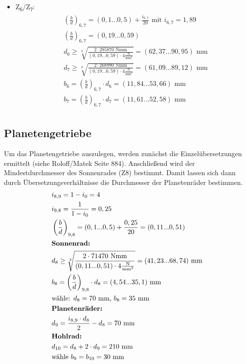 \begin{itemize}
\begin{align*}
\end{align*}
\item {Z\textsubscript{6}/Z\textsubscript{7}:}
\begin{align*}
	& \left(\frac{b}{d} \right) _{6,7} = (0,1...0,5) + \frac{i_{6,7}}{20} \text{ mit } i_{6,7} =  1,89 \\
	&\left(\frac{b}{d} \right) _{6,7}=  (0,19...0,59) \\
	&d_6 \ge \sqrt[3]{\frac{2 \cdot 285870 \text{ Nmm}}{(0,19...0,59) \cdot  4 \frac{\text{N}}{\text{mm}^2}}}= (62,37...90,95) \text{ mm}\\
	&d_7 \ge \sqrt[3]{\frac{2 \cdot 268990 \text{ Nmm}}{(0,19...0,59) \cdot  4 \frac{\text{N}}{\text{mm}^2}}}= (61,09...89,12) \text{ mm}  \\
	&b_6= \left(\frac{b}{d} \right) _{6,7}  \cdot d_6 = (11,84...53,66) \text{ mm}  \\
	&b_7= \left(\frac{b}{d} \right) _{6,7}  \cdot d_7 = (11,61...52,58) \text{ mm}  \\
\end{align*}
\end{itemize}
\subsection{Planetengetriebe}
Um das Planetengetriebe auszulegen, werden zunächst die Einzelübersetzungen ermittelt (siehe Roloff/Matek Seite 884). Anschließend wird der Mindestdurchmesser des Sonnenrades (Z8) bestimmt. Damit lassen sich dann durch Übersetzungsverhältnisse die Durchmesser der Planetenräder bestimmen.
\begin{align*}
	&i_{8,9} = 1 - i_0 = 4 \\
	&i_{9,8} = \frac{1}{1-i_0}  = 0,25 \\
	& \left(\frac{b}{d} \right) _{9,8} = (0,1...0,5) + \frac{0,25}{20}  =  (0,11...0,51) \\
	&\textbf{Sonnenrad:} \\
	&d_8 \ge \sqrt[3]{\frac{2 \cdot 71470 \text{ Nmm}}{(0,11...0,51) \cdot  4 \frac{\text{N}}{\text{mm}^2}}}= (41,23...68,74) \text{ mm}\\
	&b_8= \left(\frac{b}{d} \right) _{9,8}  \cdot d_8 = (4,54...35,1) \text{ mm}  \\
	&\text{wähle: } d_8 = 70 \text{ mm, } b_8 = 35 \text{ mm}  \\
	&\textbf{Planetenräder:} \\
	&d_9 = \frac{i_{8,9} \cdot d_8}{2 } - d_8 = 70 \text{ mm}  \\
	&\textbf{Hohlrad:} \\
	&d_{10} = d_8 + 2\cdot d_9 = 210 \text{ mm}  \\
	&\text{wähle } b_9 = b_{10} = 30 \text{ mm}  \\
\end{align*}	
